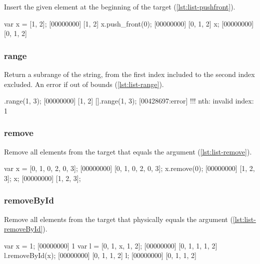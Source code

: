 Insert the given element at the beginning of the target
(\autoref{lst:list-pushfront}).

\begin{urbiscript}[caption=List.push\_front, label=lst:list-pushfront, float=\floatposh]
var x = [1, 2];
[00000000] [1, 2]
x.push_front(0);
[00000000] [0, 1, 2]
x;
[00000000] [0, 1, 2]
\end{urbiscript}

\subsubsection{range}

Return a subrange of the string, from the first index included to the
second index excluded. An error if out of bounds (\autoref{lst:list-range}).

\begin{urbiscript}[caption=List.range, label=lst:list-range, float=\floatposh]
[0, 1, 2, 3].range(1, 3);
[00000000] [1, 2]
[].range(1, 3);
[00428697:error] !!! nth: invalid index: 1
\end{urbiscript}


\subsubsection{remove}

Remove all elements from the target that equals the argument
(\autoref{lst:list-remove}).

\begin{urbiscript}[caption=List.remove, label=lst:list-remove, float=\floatposh]
var x = [0, 1, 0, 2, 0, 3];
[00000000] [0, 1, 0, 2, 0, 3];
x.remove(0);
[00000000] [1, 2, 3];
x;
[00000000] [1, 2, 3];
\end{urbiscript}

\subsubsection{removeById}

Remove all elements from the target that physically equals the
argument (\autoref{lst:list-removeById}).

\begin{urbiscript}[caption=List.removeById, label=lst:list-removeById,
  float=\floatposh]
var x = 1;
[00000000] 1
var l = [0, 1, x, 1, 2];
[00000000] [0, 1, 1, 1, 2]
l.removeById(x);
[00000000] [0, 1, 1, 2]
l;
[00000000] [0, 1, 1, 2]
\end{urbiscript}

